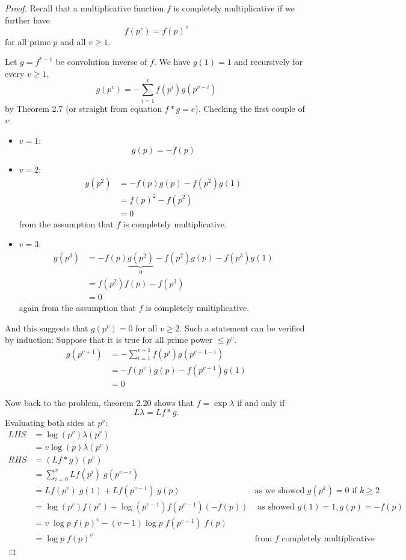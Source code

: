 \documentclass{article}
\begin{document}
\begin{proof}
Recall that a multiplicative function $f$ is completely multiplicative if we further have
$$f(p^v) = f(p)^v$$
for all prime $p$ and all $v \geq 1$.

Let $g = f^{*-1}$ be convolution inverse of $f$. We have $g(1) = 1$ and recursively for every $v \geq 1$,
$$g(p^v) = -\sum_{i = 1}^{v} f(p^i) g(p^{v-i})$$
by Theorem 2.7 (or straight from equation $f * g = e$). Checking the first couple of $v$:
\begin{itemize}
\item $v = 1$:
$$g(p) = -f(p)$$

\item $v = 2$:
\begin{align*}
g(p^2) &= -f(p)g(p) - f(p^2) g(1)\\
&= f(p)^2 - f(p^2)\\
&= 0
\end{align*}
from the assumption that $f$ is completely multiplicative.

\item $v = 3$:
\begin{align*}
g(p^3) &= -f(p) \underbrace{g(p^2)}_{0} - f(p^2) g(p) - f(p^3) g(1)\\
&= f(p^2) f(p) - f(p^3)\\
&= 0
\end{align*}
again from the assumption that $f$ is completely multiplicative.
\end{itemize}
And this suggests that $g(p^v) = 0$ for all $v \geq 2$. Such a statement can be verified by induction: Suppose that it is true for all prime power $\leq p^v$.
\begin{align*}
g(p^{v+1}) &= -\sum_{i = 1}^{v+1} f(p^i) g(p^{v+1-i})\\
&= - f(p^v) g(p) - f(p^{v+1}) g(1)\\
&= 0
\end{align*}

Now back to the problem, theorem 2.20 shows that $f = \exp \lambda$ if and only if
$$L \lambda = L f * g.$$
Evaluating both sides at $p^v$:
\begin{align*}
LHS &= \log(p^v) \lambda(p^v)\\
&= v \log(p) \lambda(p^v)\\
RHS &= (L f * g) (p^v)\\
&= \sum_{i = 0}^{v} Lf(p^i) \; g(p^{v - i})\\
&= Lf(p^v) \; g(1) + Lf(p^{v-1}) \; g(p) &\text{as we showed } g(p^k) = 0 \text{ if } k \geq 2\\
&= \log(p^v) f(p^v) + \log(p^{v-1}) f(p^{v-1}) (-f(p)) &\text{ as showed } g(1) = 1, g(p) = -f(p)\\
&= v \; \log p \; f(p)^v - (v-1) \log p \; f(p^{v-1}) \; f(p)\\
&= \log p \; f(p)^v &\text{from $f$ completely multiplicative}
\end{align*}


\end{proof}
\end{document}
